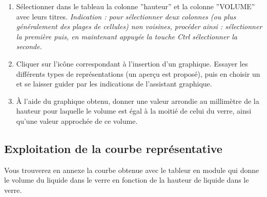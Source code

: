 \begin{enumerate}
	\item S\'electionner dans le tableau la colonne ''hauteur'' et la colonne ''VOLUME'' avec leurs titres.
\emph{Indication : pour s\'electionner deux colonnes (ou plus g\'en\'eralement des plages de cellules) non voisines, proc\'eder ainsi : s\'electionner la premi\`ere puis, en maintenant appuy\'ee la touche \emph{Ctrl} s\'electionner la seconde.}
	\item Cliquer sur l'icône correspondant \`a l'insertion d'un graphique. Essayer les diff\'erents types de repr\'esentations (un aperçu est propos\'e), puis en choisir un et se laisser guider par les indications de l'assistant graphique.
	\item \`A l'aide du graphique obtenu, donner une valeur arrondie au millim\`etre de la hauteur pour laquelle le volume est \'egal \`a la moiti\'e de celui du verre, ainsi qu'une valeur approch\'ee de ce volume.
\end{enumerate}

\subsection{Exploitation de la courbe repr\'esentative}

Vous trouverez en annexe la courbe obtenue avec le tableur en module qui donne le volume du liquide dans le verre en fonction de la hauteur de liquide dans le verre.

